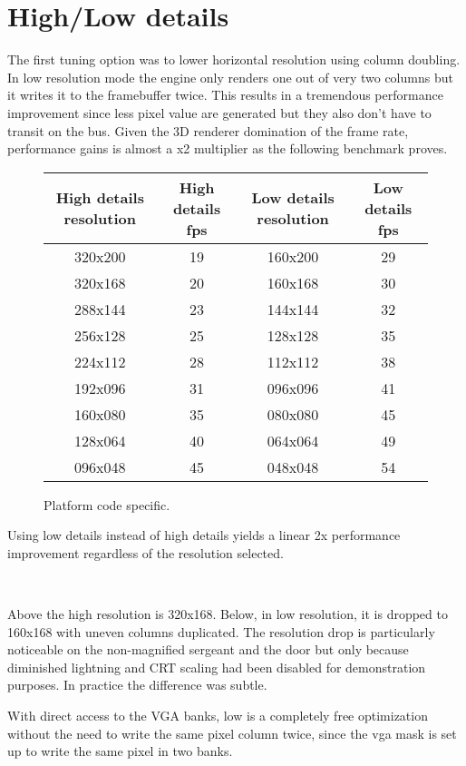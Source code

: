 \section{High/Low details}
The first tuning option was to lower horizontal resolution using column doubling. In low resolution mode the engine only renders one out of very two columns but it writes it to the framebuffer twice. This results in a tremendous performance improvement since less pixel value are generated but they also don't have to transit on the bus. Given the 3D renderer domination of the frame rate, performance gains is almost a x2 multiplier as the following benchmark proves.\\
\par
 \vspace{0.5cm}
\begin{figure}[H]
\centering  
\begin{tabularx}{\textwidth}{ C{1} C{1} C{1} C{1} } 
  \toprule
  \textbf{High details resolution} & \textbf{High details fps} &  \textbf{Low details resolution}  & \textbf{Low details fps}\\
  \toprule 
320x200  &  19   & 160x200  &       29 \\
320x168  &  20   & 160x168  &       30 \\
288x144  &  23   & 144x144  &       32 \\
256x128  &  25   & 128x128  &       35 \\
224x112  &  28   & 112x112  &       38 \\
192x096  &  31   & 096x096  &       41 \\
160x080  &  35   & 080x080  &       45 \\
128x064  &  40   & 064x064  &       49 \\
096x048  &  45   & 048x048  &       54 \\
  \toprule
\end{tabularx}
\caption{Platform code specific.\protect\footnotemark}
\end{figure}
\par
Using low details instead of high details yields a linear 2x performance improvement regardless of the resolution selected.


\vspace{-6pt}
\\
\par
Above the high resolution is 320x168. Below, in low resolution, it is dropped to 160x168 with uneven columns duplicated. The resolution drop is particularly noticeable on the non-magnified sergeant and the door but only because diminished lightning and CRT scaling had been disabled for demonstration purposes. In practice the difference was subtle.\\
\par
With direct access to the VGA banks, low is a completely free optimization without the need to write the same pixel column twice, since the vga mask is set up to write the same pixel in two banks.\\
\par
\vspace{-3pt}

